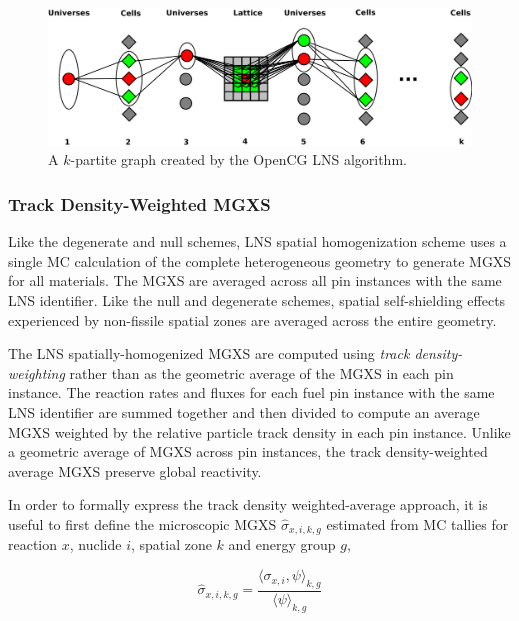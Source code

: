 \begin{figure}[h!]
  \centering
  \includegraphics[width=0.8\linewidth]{figures/lns-k-partite-graph}
  \caption{A $k$-partite graph created by the OpenCG LNS algorithm.}
  \label{fig:lns-k-partite-graph}
\end{figure}

\subsubsection{Track Density-Weighted MGXS}
\label{subsubsec:lns-math}

Like the degenerate and null schemes, LNS spatial homogenization scheme uses a single MC calculation of the complete heterogeneous geometry to generate MGXS for all materials. The MGXS are averaged across all pin instances with the same LNS identifier. Like the null and degenerate schemes, spatial self-shielding effects experienced by non-fissile spatial zones are averaged across the entire geometry. 

The LNS spatially-homogenized MGXS are computed using \textit{track density-weighting} rather than as the geometric average of the MGXS in each pin instance. The reaction rates and fluxes for each fuel pin instance with the same LNS identifier are summed together and then divided to compute an average MGXS weighted by the relative particle track density in each pin instance. Unlike a geometric average of MGXS across pin instances, the track density-weighted average MGXS preserve global reactivity.


In order to formally express the track density weighted-average approach, it is useful to first define the microscopic MGXS $\hat{\sigma}_{x,i,k,g}$ estimated from MC tallies for reaction $x$, nuclide $i$, spatial zone $k$ and energy group $g$,

\begin{equation}
\label{eqn:general-micro}
\hat{\sigma}_{x,i,k,g} = \frac{\langle \sigma_{x,i}, \psi \rangle_{k,g}}{\langle \psi \rangle_{k,g}}
\end{equation}

